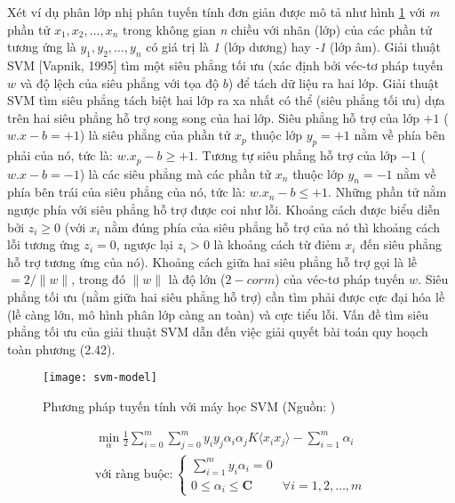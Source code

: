 Xét ví dụ phân lớp nhị phân tuyến tính đơn giản \cite{khang2019} được mô tả như hình \ref{fig:2.10} với \emph{m} phần tử $x_1, x_2, \dots, x_n$ trong không gian \emph{n} chiều với nhãn (lớp) của các phần tử tương ứng là $y_1, y_2, \dots, y_n$ có giá trị là \emph{1} (lớp dương) hay \emph{-1} (lớp âm). Giải thuật SVM [Vapnik, 1995] tìm một siêu phẳng tối ưu (xác định bởi véc-tơ pháp tuyến $w$ và độ lệch của siêu phẳng với tọa độ $b$) để tách dữ liệu ra hai lớp. Giải thuật SVM tìm siêu phẳng tách biệt hai lớp ra xa nhất có thể (siêu phẳng tối ưu) dựa trên hai siêu phẳng hỗ trợ song song của hai lớp. Siêu phẳng hỗ trợ của lớp $+1$ ($w.x - b = +1$) là siêu phẳng của phần tử $x_p$ thuộc lớp $y_p = +1$ nằm về phía bên phải của nó, tức là: $w.x_p - b \geq +1$. Tương tự siêu phẳng hỗ trợ của lớp $-1$ ($w.x - b = -1$) là các siêu phẳng mà các phần tử $x_n$ thuộc lớp $y_n = -1$ nằm về phía bên trái của siêu phẳng của nó, tức là: $w.x_n - b \leq +1$. Những phần tử nằm ngược phía với siêu phẳng hỗ trợ được coi như lỗi. Khoảng cách được biểu diễn bởi $z_i \geq 0$ (với $x_i$ nằm đúng phía của siêu phẳng hỗ trợ của nó thì khoảng cách lỗi tương ứng $z_i = 0$, ngược lại $z_i > 0$ là khoảng cách từ điẻm $x_i$ đến siêu phẳng hỗ trợ tương ứng của nó). Khoảng cách giữa hai siêu phẳng hỗ trợ gọi là lề $= 2/\|w\|$, trong đó $\|w\|$ là độ lớn ($2-corm$) của véc-tơ pháp tuyến $w$. Siêu phẳng tối ưu (nằm giữa hai siêu phẳng hỗ trợ) cần tìm phải được cực đại hóa lề (lề càng lớn, mô hình phân lớp càng an toàn) và cực tiểu lỗi. Vấn đề tìm siêu phẳng tối ưu của giải thuật SVM dẫn đến việc giải quyết bài toán quy hoạch toàn phương (2.42).

\begin{figure}[h]
	\centering
	\texttt{[image: svm-model]}
	\caption[Phương pháp tuyến tính với máy học SVM]{Phương pháp tuyến tính với máy học SVM (Nguồn: \cite{khang2019})}
	\label{fig:2.10}
\end{figure}

\begin{equation}\label{eq:svm}
	\begin{aligned}
		\min_{\alpha}\frac{1}{2} \sum_{i=0}^m \sum_{j=0}^m y_i y_j \alpha_i \alpha_j K \langle x_i x_j \rangle - \sum_{i=1}^m \alpha_i \\
		\text{với ràng buộc}:
		\begin{cases} 
			\displaystyle\sum_{i=1}^m y_i \alpha_i = 0\\
			0 \leq \alpha_i \leq \boldsymbol{C} & \forall i = 1,2, \dots, m
		\end{cases}
	\end{aligned}
\end{equation}

